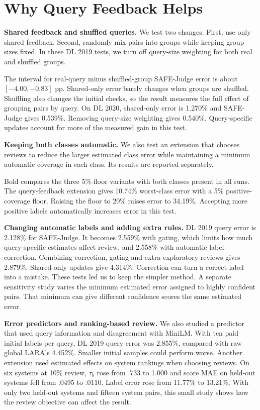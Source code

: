 \documentclass[11pt,a4paper]{article}
\begin{document}
\section{Why Query Feedback Helps}
\textbf{Shared feedback and shuffled queries.} We test two changes.
First, use only shared feedback. Second, randomly mix pairs into groups while
keeping group sizes fixed. In these DL 2019 tests, we turn off query-size
weighting for both real and shuffled groups.
\begin{center}\small\end{center}
The interval for real-query minus shuffled-group SAFE-Judge error is about
$[-4.00,-0.83]$ pp. Shared-only error barely changes when groups are shuffled.
Shuffling also changes the initial checks, so the result measures the full
effect of grouping pairs by query. On DL 2020, shared-only error is 1.270\%
and SAFE-Judge gives 0.539\%. Removing query-size weighting gives 0.540\%.
Query-specific updates account for more of the measured gain in this test.

\textbf{Keeping both classes automatic.} We also test an extension that
chooses reviews to reduce the larger estimated class error while maintaining
a minimum automatic coverage in each class. Its results are reported separately.
\begin{center}\small\end{center}
Bold compares the three 5\%-floor variants with both classes present in all runs.
The query-feedback extension gives 10.74\% worst-class error with a 5\%
positive-coverage floor. Raising the floor to 20\% raises error to 34.19\%.
Accepting more positive labels automatically increases error in this test.

\textbf{Changing automatic labels and adding extra rules.} DL 2019 query error
is 2.128\% for SAFE-Judge. It becomes 2.559\% with gating, which limits how much
query-specific estimates affect review, and 2.558\% with automatic label correction.
Combining correction, gating and extra exploratory reviews gives 2.879\%.
Shared-only updates give 4.314\%. Correction can turn a correct label into a
mistake. These tests led us to keep the simpler method. A separate sensitivity
study varies the minimum estimated error assigned to highly confident pairs.
That minimum can give different confidence scores the same estimated error.

\textbf{Error predictors and ranking-based review.} We also studied a predictor
that used query information and disagreement with MiniLM. With ten paid initial
labels per query, DL 2019 query error was 2.855\%, compared with raw global
LARA's 4.452\%. Smaller initial samples could perform worse.
Another extension used estimated effects on system rankings when choosing
reviews. On six systems at 10\% review, $\tau_b$ rose from .733 to 1.000 and
score MAE on held-out systems fell from .0495 to .0110. Label error rose from
11.77\% to 13.21\%. With only two held-out systems and fifteen system pairs,
this small study shows how the review objective can affect the result.
\end{document}
